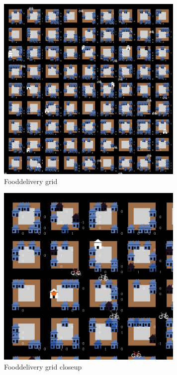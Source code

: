 \begin{figure}
    \centering
    \includegraphics[width=9cm]{sections/pics/grid}
    \caption{Fooddelivery grid}
    \label{fig:grid}
\end{figure}

\begin{figure}
    \centering
    \includegraphics[width=9cm]{sections/pics/grid_closeup}
    \caption{Fooddelivery grid closeup}
    \label{fig:grid closeup}
\end{figure}


